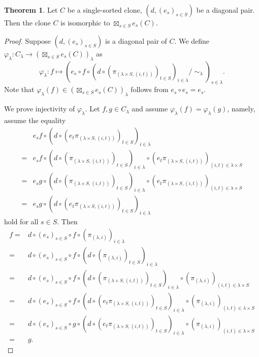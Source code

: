 \documentclass[a4paper,10pt]{article}
\theoremstyle{definition}
\newtheorem{thm}[df]{Theorem}
\newcommand\ph{\varphi}
\newcommand\ra{\rightarrow}
\newcommand\mc{\mathclose}
\begin{document}
\begin{thm}
Let $C$ be a single-sorted clone, $(d,(e_s)_{s\in S})$ be a diagonal pair.
Then the clone $C$ is isomorphic to $\boxtimes_{s\in S}e_s(C)$.
\end{thm}
\begin{proof}
Suppose $(d,(e_s)_{s\in S})$ is a diagonal pair of $C$.
We define $\ph_\lambda:C_\lambda\ra (\boxtimes_{s\in S}e_s(C))_\lambda$
as
\[
\ph_\lambda:f\mapsto 
 (e_s\circ f\circ 
  (d\circ(\pi_{(\lambda\times S,(i,t))})_{t\in S})
   _{i\in\lambda}/\mc\sim_\lambda)_{s\in \lambda}.
\]
Note that $\ph_{\lambda}(f)\in (\boxtimes_{s\in S}e_s(C))_\lambda$
follows from $e_s\circ e_s=e_s$.

We prove injectivity of $\ph_\lambda$.
Let $f,g\in C_\lambda$ and assume $\ph_\lambda(f)=\ph_\lambda(g)$,
namely, assume the equality
\begin{align*}
 &e_sf\circ(d\circ(e_t\pi_{(\lambda\times S,(i,t))})_{t\in S})_{i\in\lambda}\\
=&e_sf\circ (d\circ (\pi_{(\lambda\times S,(i,t))})_{t\in S})_{i\in\lambda}
  \circ (e_t\pi_{(\lambda\times S,(i,t))})_{(i,t)\in\lambda\times S}\\
=&e_sg\circ (d\circ (\pi_{(\lambda\times S,(i,t))})_{t\in S})_{i\in\lambda}
  \circ (e_t\pi_{(\lambda\times S,(i,t))})_{(i,t)\in\lambda\times S}\\
=&e_sg\circ(d\circ(e_t\pi_{(\lambda\times S,(i,t))})_{t\in S})_{i\in\lambda}
\end{align*}
hold for all $s\in S$. Then
\begin{align*}
f
=&d\circ (e_s)_{s\in S}\circ f\circ (\pi_{(\lambda,i)})_{i\in\lambda}\\
=&d\circ (e_s)_{s\in S}\circ f\circ 
  (d\circ (\pi_{(\lambda,i)})_{t\in S})_{i\in\lambda}\\
=&d\circ (e_s)_{s\in S}\circ f\circ 
  (d\circ (\pi_{(\lambda\times S,(i,t))})_{t\in S})_{i\in\lambda}
  \circ (\pi_{(\lambda,i)})_{(i,t)\in\lambda\times S}\\
=&d\circ (e_s)_{s\in S}\circ f\circ 
  (d\circ (e_t\pi_{(\lambda\times S,(i,t))})_{t\in S})_{i\in\lambda}
  \circ (\pi_{(\lambda,i)})_{(i,t)\in\lambda\times S}\\
=&d\circ (e_s)_{s\in S}\circ g\circ 
  (d\circ (e_t\pi_{(\lambda\times S,(i,t))})_{t\in S})_{i\in\lambda}
  \circ (\pi_{(\lambda,i)})_{(i,t)\in\lambda\times S}\\
=&g.
\end{align*}


\end{proof}
\end{document}
